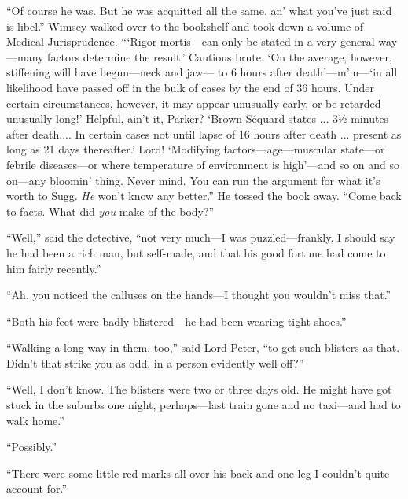 \enquote{Of course he was. But he was acquitted all the same, an’ what you’ve just said is libel.} Wimsey walked over to the bookshelf and took down a volume of Medical Jurisprudence. \enquote{\enquote{Rigor mortis\allowbreak---\allowbreak can only be stated in a very general way\allowbreak---\allowbreak many factors determine the result.} Cautious brute. \enquote{On the average, however, stiffening will have begun\allowbreak---\allowbreak neck and jaw\allowbreak--- to 6 hours after death}---m’m---\enquote{in all likelihood have passed off in the bulk of cases by the end of 36 hours. Under certain circumstances, however, it may appear unusually early, or be retarded unusually long!} Helpful, ain’t it, Parker? \enquote{Brown-Séquard states ... 3½ minutes after death.... In certain cases not until lapse of 16 hours after death ... present as long as 21 days thereafter.} Lord! \enquote{Modifying factors\allowbreak---\allowbreak age---muscular state\allowbreak---\allowbreak or febrile diseases\allowbreak---\allowbreak or where temperature of environment is high}---and so on and so on\allowbreak---\allowbreak any bloomin’ thing. Never mind. You can run the argument for what it’s worth to Sugg. \textit{He} won’t know any better.} He tossed the book away. \enquote{Come back to facts. What did \textit{you} make of the body?}

\enquote{Well,} said the detective, \enquote{not very much\allowbreak---\allowbreak I was puzzled\allowbreak---\allowbreak frankly. I should say he had been a rich man, but self-made, and that his good fortune had come to him fairly recently.}

\enquote{Ah, you noticed the calluses on the hands\allowbreak---\allowbreak I thought you wouldn’t miss that.}

\enquote{Both his feet were badly blistered\allowbreak---\allowbreak he had been wearing tight shoes.}

\enquote{Walking a long way in them, too,} said Lord Peter, \enquote{to get such blisters as that. Didn’t that strike you as odd, in a person evidently well off?}

\enquote{Well, I don’t know. The blisters were two or three days old. He might have got stuck in the suburbs one night, perhaps\allowbreak---\allowbreak last train gone and no taxi\allowbreak---\allowbreak and had to walk home.}

\enquote{Possibly.}

\enquote{There were some little red marks all over his back and one leg I couldn’t quite account for.}


